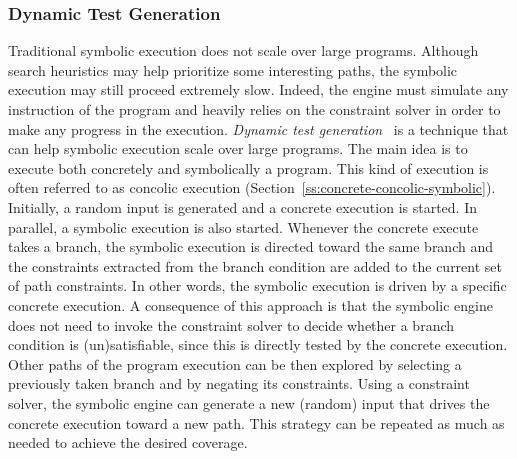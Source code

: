 \subsubsection{Dynamic Test Generation}
Traditional symbolic execution does not scale over large programs. Although search heuristics may help prioritize some interesting paths, the symbolic execution may still proceed extremely slow. Indeed, the engine must simulate any instruction of the program and heavily relies on the constraint solver in order to make any progress in the execution. {\em Dynamic test generation}~\cite{DART-PLDI05} is a technique that can help symbolic execution scale over large programs. The main idea is to execute both concretely and symbolically a program. This kind of execution is often referred to as concolic execution (Section~\ref{ss:concrete-concolic-symbolic}). Initially, a random input is generated and a concrete execution is started. In parallel, a symbolic execution is also started. Whenever the concrete execute takes a branch, the symbolic execution is directed toward the same branch and the constraints extracted from the branch condition are added to the current set of path constraints. In other words, the symbolic execution is driven by a specific concrete execution. A consequence of this approach is that the symbolic engine does not need to invoke the constraint solver to decide whether a branch condition is (un)satisfiable, since this is directly tested by the concrete execution. Other paths of the program execution can be then explored by selecting a previously taken branch and by negating its constraints. Using a constraint solver, the symbolic engine can generate a new (random) input that drives the concrete execution toward a new path. This strategy can be repeated as much as needed to achieve the desired coverage.

